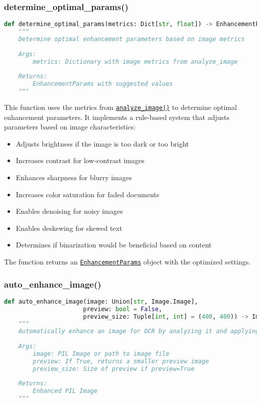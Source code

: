 \subsubsection{determine\_optimal\_params()}
\begin{lstlisting}[language=Python, caption=Parameter Determination Function]
def determine_optimal_params(metrics: Dict[str, float]) -> EnhancementParams:
    """
    Determine optimal enhancement parameters based on image metrics
    
    Args:
        metrics: Dictionary with image metrics from analyze_image
        
    Returns:
        EnhancementParams with suggested values
    """
\end{lstlisting}

This function uses the metrics from \hyperref[sec:analyze_image]{\texttt{analyze\_image()}} to determine optimal enhancement parameters. It implements a rule-based system that adjusts parameters based on image characteristics:

\begin{itemize}
    \item Adjusts brightness if the image is too dark or too bright
    \item Increases contrast for low-contrast images
    \item Enhances sharpness for blurry images
    \item Increases color saturation for faded documents
    \item Enables denoising for noisy images
    \item Enables deskewing for skewed text
    \item Determines if binarization would be beneficial based on content
\end{itemize}

The function returns an \hyperref[sec:enhancement_params]{\texttt{EnhancementParams}} object with the optimized settings.

\subsubsection{auto\_enhance\_image()}
\begin{lstlisting}[language=Python, caption=Auto Enhancement Function]
def auto_enhance_image(image: Union[str, Image.Image], 
                      preview: bool = False, 
                      preview_size: Tuple[int, int] = (400, 400)) -> Image.Image:
    """
    Automatically enhance an image for OCR by analyzing it and applying optimal enhancements
    
    Args:
        image: PIL Image or path to image file
        preview: If True, returns a smaller preview image
        preview_size: Size of preview if preview=True
        
    Returns:
        Enhanced PIL Image
    """
\end{lstlisting}

